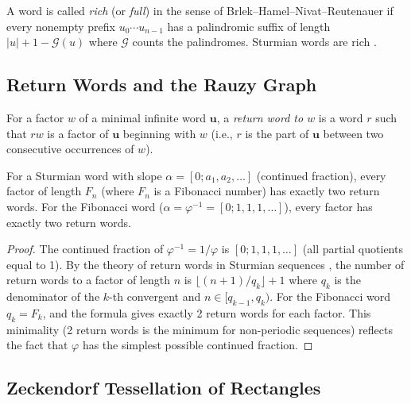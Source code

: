 A word is called \emph{rich} (or \emph{full}) in the sense of
Brlek--Hamel--Nivat--Reutenauer if every nonempty prefix \(u_0\cdots u_{n-1}\)
has a palindromic suffix of length \(|u|+1-\mathcal{G}(u)\) where
\(\mathcal{G}\) counts the palindromes.  Sturmian words are rich
\cite[Theorem~7]{pytheasfogg2002substitutions}.

\subsection{Return Words and the Rauzy Graph}
\label{subsec:ch19-rauzy}

\begin{definition}\label{def:return-word}
  For a factor \(w\) of a minimal infinite word \(\mathbf{u}\),
  a \emph{return word to \(w\)} is a word \(r\) such that
  \(rw\) is a factor of \(\mathbf{u}\) beginning with \(w\)
  (i.e., \(r\) is the part of \(\mathbf{u}\) between two consecutive
  occurrences of \(w\)).
\end{definition}

\begin{theorem}%
  \label{thm:return-words}
  For a Sturmian word with slope \(\alpha=[0;a_1,a_2,\ldots]\)
  (continued fraction), every factor of length \(F_n\) (where
  \(F_n\) is a Fibonacci number) has exactly two return words.
  For the Fibonacci word (\(\alpha=\varphi^{-1}=[0;1,1,1,\ldots]\)),
  every factor has exactly two return words.
\end{theorem}
\begin{proof}
  The continued fraction of \(\varphi^{-1}=1/\varphi\) is
  \([0;1,1,1,\ldots]\) (all partial quotients equal to 1).  By the
  theory of return words in Sturmian sequences
  \cite[\S4.4]{pytheasfogg2002substitutions},
  the number of return words to a factor of length \(n\) is
  \(\lfloor(n+1)/q_k\rfloor+1\) where \(q_k\) is the
  denominator of the \(k\)-th convergent and \(n\in[q_{k-1},q_k)\).
  For the Fibonacci word \(q_k=F_k\), and the formula gives exactly 2
  return words for each factor.  This minimality (2 return words is
  the minimum for non-periodic sequences) reflects the fact that
  \(\varphi\) has the simplest possible continued fraction.
\end{proof}

\subsection{Zeckendorf Tessellation of Rectangles}
\label{subsec:ch19-zeckendorf-tess}

